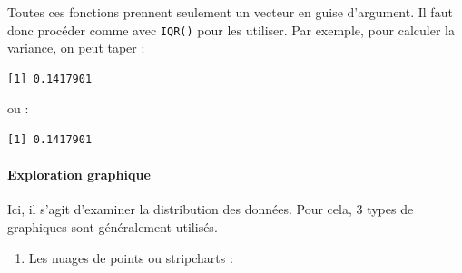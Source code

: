 \documentclass[
  a4paper,
]{article}
\newenvironment{Shaded}{\begin{snugshade}}{\end{snugshade}}
\newcommand{\DataTypeTok}[1]{\textcolor[rgb]{0.00,0.34,0.68}{#1}}
\newcommand{\DecValTok}[1]{\textcolor[rgb]{0.69,0.50,0.00}{#1}}
\newcommand{\KeywordTok}[1]{\textcolor[rgb]{0.12,0.11,0.11}{\textbf{#1}}}
\newcommand{\NormalTok}[1]{\textcolor[rgb]{0.12,0.11,0.11}{#1}}
\newcommand{\OperatorTok}[1]{\textcolor[rgb]{0.12,0.11,0.11}{#1}}
\newcommand{\StringTok}[1]{\textcolor[rgb]{0.75,0.01,0.01}{#1}}
\providecommand{\tightlist}{%
  \setlength{\itemsep}{0pt}\setlength{\parskip}{0pt}}
\begin{document}
Toutes ces fonctions prennent seulement un vecteur en guise d'argument. Il faut donc procéder comme avec \texttt{IQR()} pour les utiliser. Par exemple, pour calculer la variance, on peut taper :

\begin{Shaded}
\end{Shaded}

\begin{verbatim}
[1] 0.1417901
\end{verbatim}

ou :

\begin{Shaded}
\end{Shaded}

\begin{verbatim}
[1] 0.1417901
\end{verbatim}

\hypertarget{exploration-graphique}{%
\paragraph{Exploration graphique}\label{exploration-graphique}}

Ici, il s'agit d'examiner la distribution des données. Pour cela, 3 types de graphiques sont généralement utilisés.

\begin{enumerate}
\def\labelenumi{\arabic{enumi}.}
\tightlist
\item
  Les nuages de points ou stripcharts :
\end{enumerate}

\begin{Shaded}
\end{Shaded}
\end{document}
